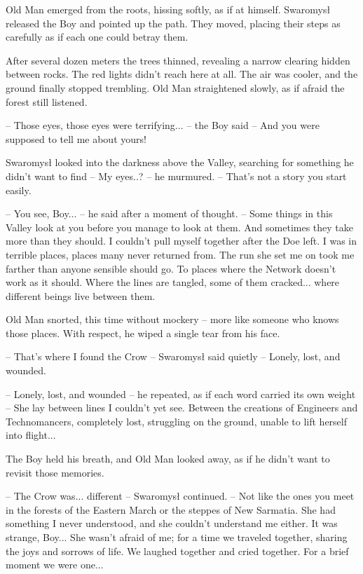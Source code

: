 \par\indent Old Man emerged from the roots, hissing softly, as if at himself. Swaromysł released the Boy and pointed up the path. They moved, placing their steps as carefully as if each one could betray them. 
\par\indent After several dozen meters the trees thinned, revealing a narrow clearing hidden between rocks. The red lights didn't reach here at all. The air was cooler, and the ground finally stopped trembling. Old Man straightened slowly, as if afraid the forest still listened. 
\par\noindent-- Those eyes, those eyes were terrifying... -- the Boy said -- And you were supposed to tell me about yours! 
\par\indent Swaromysł looked into the darkness above the Valley, searching for something he didn't want to find -- My eyes..? -- he murmured. -- That's not a story you start easily. 
\par\indent-- You see, Boy... -- he said after a moment of thought. -- Some things in this Valley look at you before you manage to look at them. And sometimes they take more than they should. I couldn't pull myself together after the Doe left. I was in terrible places, places many never returned from. The run she set me on took me farther than anyone sensible should go. To places where the Network doesn't work as it should. Where the lines are tangled, some of them cracked... where different beings live between them. 
\par\indent Old Man snorted, this time without mockery -- more like someone who knows those places. With respect, he wiped a single tear from his face. 
\par\noindent-- That's where I found the Crow -- Swaromysł said quietly -- Lonely, lost, and wounded. 
\par\noindent-- Lonely, lost, and wounded -- he repeated, as if each word carried its own weight -- She lay between lines I couldn't yet see. Between the creations of Engineers and Technomancers, completely lost, struggling on the ground, unable to lift herself into flight... 
\par\indent The Boy held his breath, and Old Man looked away, as if he didn't want to revisit those memories. 
\par\noindent-- The Crow was... different -- Swaromysł continued. -- Not like the ones you meet in the forests of the Eastern March or the steppes of New Sarmatia. She had something I never understood, and she couldn't understand me either. It was strange, Boy... She wasn't afraid of me; for a time we traveled together, sharing the joys and sorrows of life. We laughed together and cried together. For a brief moment we were one... 
